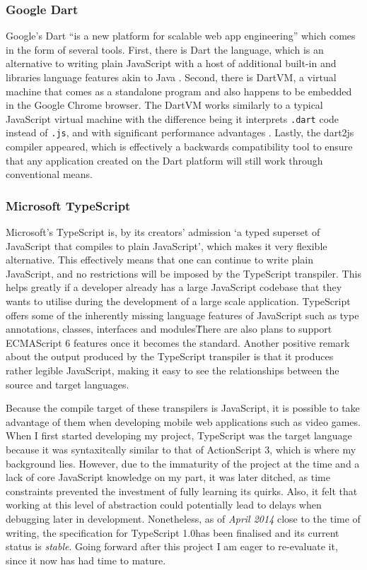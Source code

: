 \documentclass[final]{cmpreport}
\begin{document}
\subsubsection{Google Dart}
Google's Dart ``is a new platform for scalable web app engineering'' which comes in the form of several tools. First, there is Dart the language, which is an alternative to writing plain JavaScript with a host of additional built-in and libraries language features akin to Java \citep{Fortuna}. Second, there is DartVM, a virtual machine that comes as a standalone program and also happens to be embedded in the Google Chrome browser. The DartVM works similarly to a typical JavaScript virtual machine with the difference being it interprets \texttt{.dart} code instead of \texttt{.js}, and with significant performance advantages \citep{Schneider}. Lastly, the dart2js compiler appeared, which is effectively a backwards compatibility tool to ensure that any application created on the Dart platform will still work through conventional means.

\subsubsection{Microsoft TypeScript}
Microsoft's TypeScript is, by its creators' admission `a typed superset of JavaScript that compiles to plain JavaScript', which makes it very flexible alternative. This effectively means that one can continue to write plain JavaScript, and no restrictions will be imposed by the TypeScript transpiler. This helps greatly if a developer already has a large JavaScript codebase that they wants to utilise during the development of a large scale application. TypeScript offers some of the inherently missing language features of JavaScript such as type annotations, classes, interfaces and modules\. There are also plans to support ECMAScript 6 features once it becomes the standard. Another positive remark about the output produced by the TypeScript transpiler is that it produces rather legible JavaScript, making it easy to see the relationships between the source and target languages.

Because the compile target of these transpilers is JavaScript, it is possible to take advantage of them when developing mobile web applications such as video games. When I first started developing my project, TypeScript was the target language because it was syntaxitcally similar to that of ActionScript 3, which is where my background lies. However, due to the immaturity of the project at the time and a lack of core JavaScript knowledge on my part, it was later ditched, as time constraints prevented the investment of fully learning its quirks. Also, it felt that working at this level of abstraction could potentially lead to delays when debugging later in development. Nonetheless, as of \textit{April 2014} close to the time of writing, the specification for TypeScript 1.0\footnotemark[11] has been finalised and its current status is \textit{stable}. Going forward after this project I am eager to re-evaluate it, since it now has had time to mature.
\end{document}
